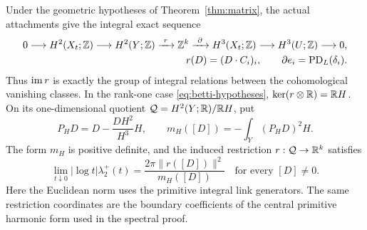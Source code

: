 \begin{proposition}\label{prop:restriction-spectrum}
Under the geometric hypotheses of Theorem~\ref{thm:matrix}, the actual attachments
give the integral exact sequence
\begin{equation}\label{eq:general-restriction}
\begin{split}
0\longrightarrow H^2(X_t;\mathbb Z)\longrightarrow H^2(Y;\mathbb Z)
\xrightarrow{\ r\ }\mathbb Z^k\xrightarrow{\ \partial\ }
H^3(X_t;\mathbb Z)\longrightarrow H^3(U;\mathbb Z)\longrightarrow0,\\
r(D)=(D\cdot C_i)_i,\qquad \partial e_i=\operatorname{PD}_L(\delta_i).
\end{split}
\end{equation}
Thus $\operatorname{im} r$ is exactly the group of integral relations between the
cohomological vanishing classes. In the rank-one case
\eqref{eq:betti-hypotheses}, $\ker(r\otimes\mathbb R)=\mathbb R H$.
On its one-dimensional quotient
$\mathcal Q=H^2(Y;\mathbb R)/\mathbb R H$, put
\[
 P_HD=D-\frac{DH^2}{H^3}H,\qquad
 m_H([D])=-\int_Y(P_HD)^2H.
\]
The form $m_H$ is positive definite, and the induced restriction
$r:\mathcal Q\to\mathbb R^k$ satisfies
\begin{equation}\label{eq:restriction-quotient-law}
 \lim_{t\downarrow0}|\log t|\lambda_2^+(t)
 =\frac{2\pi\|r([D])\|^2}{m_H([D])}
 \quad\text{for every }[D]\ne0.
\end{equation}
Here the Euclidean norm uses the primitive integral link generators.
The same restriction coordinates are the boundary coefficients of
the central primitive harmonic form used in the spectral proof.
\end{proposition}
